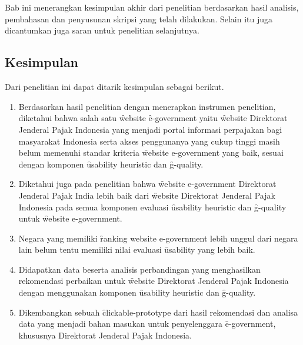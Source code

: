 \chapter{\babEnam}
Bab ini menerangkan kesimpulan akhir dari penelitian berdasarkan hasil analisis, pembahasan dan penyusunan skripsi yang telah dilakukan. Selain itu juga dicantumkan juga saran untuk penelitian selanjutnya.
\section{Kesimpulan}
Dari penelitian ini dapat ditarik kesimpulan sebagai berikut.
\begin{enumerate}
	\item Berdasarkan hasil penelitian dengan menerapkan instrumen penelitian, diketahui bahwa salah satu \f{website} \f{e-government} yaitu \f{website} Direktorat Jenderal Pajak Indonesia yang menjadi portal informasi perpajakan bagi masyarakat Indonesia serta akses penggunanya yang cukup tinggi masih belum memenuhi standar kriteria \f{website e-government} yang baik, sesuai dengan komponen \f{usability heuristic} dan \f{g-quality}. 
	\item Diketahui juga pada penelitian bahwa \f{website e-government} Direktorat Jenderal Pajak India lebih baik dari \f{website} Direktorat Jenderal Pajak Indonesia pada semua komponen evaluasi \f{usability heuristic} dan \f{g-quality} untuk \f{website e-government}.
	\item Negara yang memiliki \f{ranking website e-government} lebih unggul dari negara lain belum tentu memiliki nilai evaluasi \f{usability} yang lebih baik.
	\item Didapatkan data beserta analisis perbandingan yang menghasilkan rekomendasi perbaikan untuk \f{website} Direktorat Jenderal Pajak Indonesia dengan menggunakan komponen \f{usability heuristic} dan \f{g-quality}.
	\item Dikembangkan sebuah \f{clickable-prototype} dari hasil rekomendasi dan analisa data yang menjadi bahan masukan untuk penyelenggara \f{e-government}, khususnya Direktorat Jenderal Pajak Indonesia.
\end{enumerate}
\pagebreak
